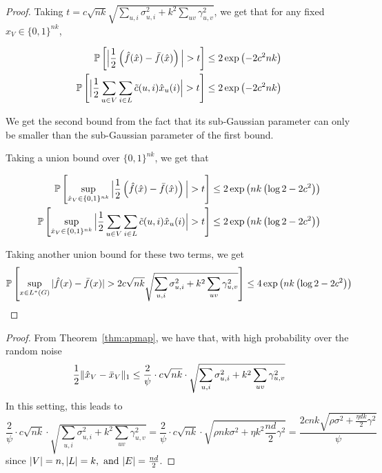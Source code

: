 \begin{proof}
Taking $t = c\sqrt{nk}\sqrt{\sum_{u,i}\sigma_{u,i}^2 + k^2\sum_{uv}\gamma_{u,v}^2}$, we get that for any fixed $\hat x_V \in \{0,1\}^{nk}$,

\begin{align*}
    \mathbb{P} \left[\Big| \frac{1}{2} \left(\hat f(\hat x) - \bar{f}(\hat x)\right) \Big| > t\right] &\leq 2\exp\left(-2c^2 nk\right)
    \\\mathbb{P} \left[\Big|\frac{1}{2}\sum_{u \in V} \sum_{i \in L} \tilde{c}(u,i)\hat x_u(i) \Big| > t\right] &\leq 2\exp\left(-2c^2 nk\right)
\end{align*}

We get the second bound from the fact that its sub-Gaussian parameter can only be smaller than the sub-Gaussian parameter of the first bound.

Taking a union bound over $\{0,1\}^{nk}$, we get that

\begin{align*}
    \mathbb{P} \left[ \sup_{\hat x_V \in \{0,1\}^{nk}}  \Big| \frac{1}{2} \left(\hat f(\hat x) - \bar{f}(\hat x)\right) \Big| > t\right] &\leq 2\exp\left(nk\left(\log 2 - 2c^2\right)\right)
    \\\mathbb{P} \left[\sup_{\hat x_V \in \{0,1\}^{nk}} \Big|\frac{1}{2}\sum_{u \in V} \sum_{i \in L} \tilde{c}(u,i)\hat x_u(i) \Big| > t\right] &\leq 2\exp\left(nk\left(\log 2 - 2c^2\right)\right)
\end{align*}

Taking another union bound for these two terms, we get 
\[ \mathbb{P} \left[\sup_{x \in L^*(G)}|\hat f(x) - \bar{f}(x)| > 2c\sqrt{nk}\sqrt{\sum_{u,i}\sigma_{u,i}^2 + k^2\sum_{uv}\gamma_{u,v}^2} \right] \leq 4\exp\left(nk\left(\log 2 - 2c^2\right)\right) \]
\end{proof}

\mapreg*
\begin{proof}
From Theorem~\ref{thm:apmap}, we have that, with high probability over the random noise \[ \frac{1}{2}\lVert \hat{x}_V - \bar{x}_V \rVert_1 \le \frac{2}{\psi} \cdot c\sqrt{nk} \cdot \sqrt{\sum_{u,i}\sigma_{u,i}^2 + k^2\sum_{uv}\gamma_{u,v}^2} \]
In this setting, this leads to 
\[ \frac{2}{\psi} \cdot c\sqrt{nk} \cdot \sqrt{\sum_{u,i}\sigma_{u,i}^2 + k^2\sum_{uv}\gamma_{u,v}^2} = \frac{2}{\psi} \cdot c\sqrt{nk} \cdot \sqrt{\rho nk\sigma^2 + \eta k^2 \frac{nd}{2} \gamma^2}
    = \frac{2cnk\sqrt{\rho \sigma^2 + \frac{\eta dk}{2} \gamma^2}}{\psi} \]
since $|V| = n, |L| = k, \text{ and } |E| = \frac{nd}{2}$.
\fi


\end{proof}

